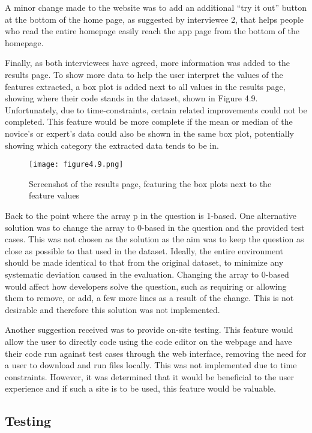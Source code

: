 \documentclass{report}
\begin{document}
A minor change made to the website was to add an additional “try it out” button at the bottom of the home page, as suggested by interviewee 2, that helps people who read the entire homepage easily reach the app page from the bottom of the homepage.

Finally, as both interviewees have agreed, more information was added to the results page. To show more data to help the user interpret the values of the features extracted, a box plot is added next to all values in the results page, showing where their code stands in the dataset, shown in Figure 4.9. Unfortunately, due to time-constraints, certain related improvements could not be completed. This feature would be more complete if the mean or median of the novice's or expert's data could also be shown in the same box plot, potentially showing which category the extracted data tends to be in.

\begin{figure}[h!]
\centering
\texttt{[image: figure4.9.png]}
\caption{Screenshot of the results page, featuring the box plots next to the feature values}
\end{figure}

Back to the point where the array p in the question is 1-based. One alternative solution was to change the array to 0-based in the question and the provided test cases. This was not chosen as the solution as the aim was to keep the question as close as possible to that used in the dataset. Ideally, the entire environment should be made identical to that from the original dataset, to minimize any systematic deviation caused in the evaluation. Changing the array to 0-based would affect how developers solve the question, such as requiring or allowing them to remove, or add, a few more lines as a result of the change. This is not desirable and therefore this solution was not implemented.

Another suggestion received was to provide on-site testing. This feature would allow the user to directly code using the code editor on the webpage and have their code run against test cases through the web interface, removing the need for a user to download and run files locally. This was not implemented due to time constraints. However, it was determined that it would be beneficial to the user experience and if such a site is to be used, this feature would be valuable.

\subsection{Testing}
\end{document}
